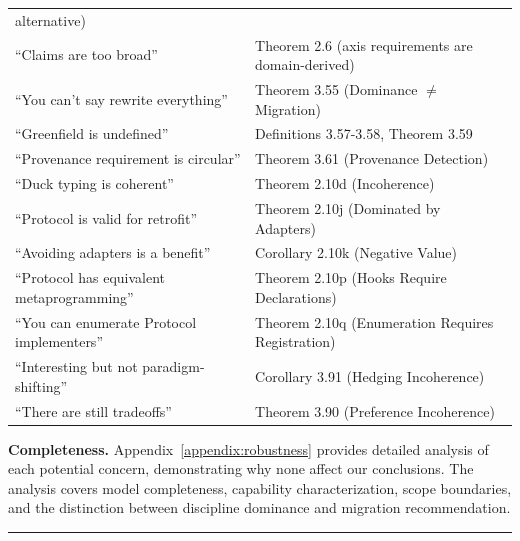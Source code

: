 \begin{longtable}[]{@{}
  >{\raggedright\arraybackslash}p{}
  >{\raggedright\arraybackslash}p{}@{}}
alternative) \\
``Claims are too broad'' & Theorem 2.6 (axis requirements are domain-derived) \\
``You can't say rewrite everything'' & Theorem 3.55 (Dominance $\neq$
Migration) \\
``Greenfield is undefined'' & Definitions 3.57-3.58, Theorem 3.59 \\
``Provenance requirement is circular'' & Theorem 3.61 (Provenance
Detection) \\
``Duck typing is coherent'' & Theorem 2.10d (Incoherence) \\
``Protocol is valid for retrofit'' & Theorem 2.10j (Dominated by
Adapters) \\
``Avoiding adapters is a benefit'' & Corollary 2.10k (Negative Value) \\
``Protocol has equivalent metaprogramming'' & Theorem 2.10p (Hooks
Require Declarations) \\
``You can enumerate Protocol implementers'' & Theorem 2.10q (Enumeration
Requires Registration) \\
``Interesting but not paradigm-shifting'' & Corollary 3.91 (Hedging Incoherence) \\
``There are still tradeoffs'' & Theorem 3.90 (Preference Incoherence) \\
\end{longtable}

\textbf{Completeness.} Appendix~\ref{appendix:robustness} provides detailed
analysis of each potential concern, demonstrating why none affect our conclusions.
The analysis covers model completeness, capability characterization, scope
boundaries, and the distinction between discipline dominance and migration
recommendation.

\begin{center}\rule{0.5\linewidth}{0.5pt}\end{center}

